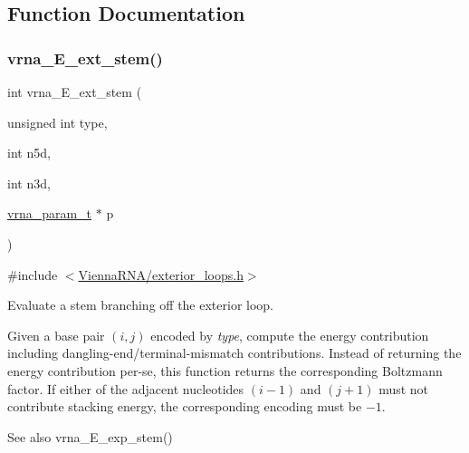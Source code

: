 \subsection{Function Documentation}
\mbox{\label{group__loops_gaa0c313c90da11aa741dcd62746d85337}} 
\subsubsection{\texorpdfstring{vrna\+\_\+\+E\+\_\+ext\+\_\+stem()}{vrna\_E\_ext\_stem()}}
{\footnotesize\ttfamily int vrna\+\_\+\+E\+\_\+ext\+\_\+stem (\begin{DoxyParamCaption}\item[{unsigned int}]{type,  }\item[{int}]{n5d,  }\item[{int}]{n3d,  }\item[{\hyperlink{group__energy__parameters_ga8a69ca7d787e4fd6079914f5343a1f35}{vrna\+\_\+param\+\_\+t} $\ast$}]{p }\end{DoxyParamCaption})}



{\ttfamily \#include $<$\hyperlink{exterior__loops_8h}{Vienna\+R\+N\+A/exterior\+\_\+loops.\+h}$>$}



Evaluate a stem branching off the exterior loop. 

Given a base pair $(i,j)$ encoded by {\itshape type}, compute the energy contribution including dangling-\/end/terminal-\/mismatch contributions. Instead of returning the energy contribution per-\/se, this function returns the corresponding Boltzmann factor. If either of the adjacent nucleotides $(i - 1)$ and $(j+1)$ must not contribute stacking energy, the corresponding encoding must be $-1$.

\begin{DoxySeeAlso}{See also}
vrna\+\_\+\+E\+\_\+exp\+\_\+stem()
\end{DoxySeeAlso}

